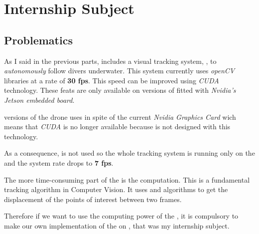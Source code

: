 
\chapter{Internship Subject} %

\label{Chapter3} %




\section{Problematics}

As I said in the previous parts, \iBubble{} includes a visual tracking system, , to \emph{autonomously} follow divers underwater. This system currently uses \emph{openCV} libraries at a rate of \textbf{30 fps}. This speed can be improved using \emph{CUDA} technology. These feat{}s are only available on  versions of \iBubble{} fitted with \emph{Nvidia's Jetson embedded board}.

 versions of the drone uses \rasp{} in spite of the current \emph{Nvidia Graphics Card} wich means that \emph{CUDA} is no longer available because \vc{} is not designed with this technology.

As a consequence, \vc{} is not used so the whole tracking system is running only on the \cpu{} and the system rate drops to \textbf{7 fps}.

The more time-consuming part of the  is the \flow{} computation. This is a fundamental tracking algorithm in Computer Vision. It uses  and  algorithms to get the displacement of the points of interest between two frames.

Therefore if we want to use the computing power of the \vc{}, it is compulsory to make our own implementation of the \flow{} on \rasp, that was my internship subject.


